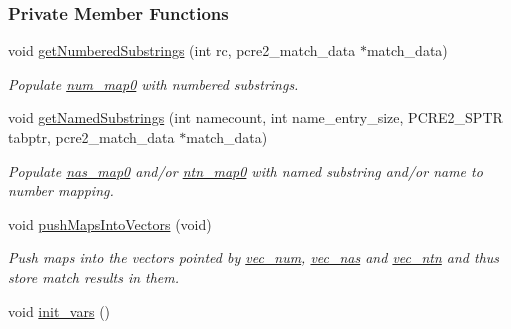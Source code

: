 \subsubsection*{Private Member Functions}
\begin{DoxyCompactItemize}
\item 
void \hyperlink{classjpcre2_1_1RegexMatch_a961a5f91ab24a1ddfd42910c6ab68b65}{get\+Numbered\+Substrings} (int rc, pcre2\+\_\+match\+\_\+data $\ast$match\+\_\+data)\hypertarget{classjpcre2_1_1RegexMatch_a961a5f91ab24a1ddfd42910c6ab68b65}{}\label{classjpcre2_1_1RegexMatch_a961a5f91ab24a1ddfd42910c6ab68b65}

\begin{DoxyCompactList}\small\item\em Populate \hyperlink{classjpcre2_1_1RegexMatch_a94ad930ea8cb22873737fda344bae508}{num\+\_\+map0} with numbered substrings. \end{DoxyCompactList}\item 
void \hyperlink{classjpcre2_1_1RegexMatch_af159e8d080ecd74f63ec67b1d5a27772}{get\+Named\+Substrings} (int namecount, int name\+\_\+entry\+\_\+size, P\+C\+R\+E2\+\_\+\+S\+P\+TR tabptr, pcre2\+\_\+match\+\_\+data $\ast$match\+\_\+data)\hypertarget{classjpcre2_1_1RegexMatch_af159e8d080ecd74f63ec67b1d5a27772}{}\label{classjpcre2_1_1RegexMatch_af159e8d080ecd74f63ec67b1d5a27772}

\begin{DoxyCompactList}\small\item\em Populate \hyperlink{classjpcre2_1_1RegexMatch_a36749947847f266de03c3991ac88a694}{nas\+\_\+map0} and/or \hyperlink{classjpcre2_1_1RegexMatch_a1c790683d023313967ce80db6045419f}{ntn\+\_\+map0} with named substring and/or name to number mapping. \end{DoxyCompactList}\item 
void \hyperlink{classjpcre2_1_1RegexMatch_aeeffc8edc43a8e5d1d24ae4055213730}{push\+Maps\+Into\+Vectors} (void)\hypertarget{classjpcre2_1_1RegexMatch_aeeffc8edc43a8e5d1d24ae4055213730}{}\label{classjpcre2_1_1RegexMatch_aeeffc8edc43a8e5d1d24ae4055213730}

\begin{DoxyCompactList}\small\item\em Push maps into the vectors pointed by \hyperlink{classjpcre2_1_1RegexMatch_a836705e0444568c78abaab4c8e351335}{vec\+\_\+num}, \hyperlink{classjpcre2_1_1RegexMatch_a812b57dc08fdc0caa93a1b508ef8242c}{vec\+\_\+nas} and \hyperlink{classjpcre2_1_1RegexMatch_a86ef413ab6d237972af858be26ff77f7}{vec\+\_\+ntn} and thus store match results in them. \end{DoxyCompactList}\item 
void \hyperlink{classjpcre2_1_1RegexMatch_a3da6a2319cd577d7f2f10c66dcf59a99}{init\+\_\+vars} ()\hypertarget{classjpcre2_1_1RegexMatch_a3da6a2319cd577d7f2f10c66dcf59a99}{}\label{classjpcre2_1_1RegexMatch_a3da6a2319cd577d7f2f10c66dcf59a99}


\end{DoxyCompactItemize}
